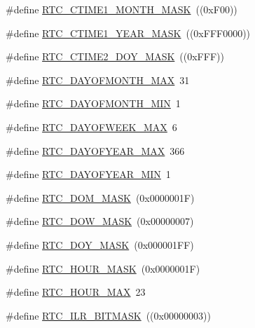 \begin{DoxyCompactItemize}
\item 
\#define \hyperlink{group__RTC__17XX__40XX_ga9778cbc861fb273870db239e31cc6140}{R\+T\+C\+\_\+\+C\+T\+I\+M\+E1\+\_\+\+M\+O\+N\+T\+H\+\_\+\+M\+A\+SK}~((0x\+F00))
\item 
\#define \hyperlink{group__RTC__17XX__40XX_gae56e613fe29951a7adaa30e1a3cad8b4}{R\+T\+C\+\_\+\+C\+T\+I\+M\+E1\+\_\+\+Y\+E\+A\+R\+\_\+\+M\+A\+SK}~((0x\+F\+F\+F0000))
\item 
\#define \hyperlink{group__RTC__17XX__40XX_gaef423e0d45dc1e2a201d44f8abb1253a}{R\+T\+C\+\_\+\+C\+T\+I\+M\+E2\+\_\+\+D\+O\+Y\+\_\+\+M\+A\+SK}~((0x\+F\+F\+F))
\item 
\#define \hyperlink{group__RTC__17XX__40XX_gaddd515ae325f802e35e8202fef5f2957}{R\+T\+C\+\_\+\+D\+A\+Y\+O\+F\+M\+O\+N\+T\+H\+\_\+\+M\+AX}~31
\item 
\#define \hyperlink{group__RTC__17XX__40XX_gafbcf1009356ffdad8f11920167908213}{R\+T\+C\+\_\+\+D\+A\+Y\+O\+F\+M\+O\+N\+T\+H\+\_\+\+M\+IN}~1
\item 
\#define \hyperlink{group__RTC__17XX__40XX_ga83c5c53e8b56ca8d48d9c46d7e8c50fa}{R\+T\+C\+\_\+\+D\+A\+Y\+O\+F\+W\+E\+E\+K\+\_\+\+M\+AX}~6
\item 
\#define \hyperlink{group__RTC__17XX__40XX_ga2621bb8d69ee212101605c2e3739db4d}{R\+T\+C\+\_\+\+D\+A\+Y\+O\+F\+Y\+E\+A\+R\+\_\+\+M\+AX}~366
\item 
\#define \hyperlink{group__RTC__17XX__40XX_ga132dcf308a59affe54749f4f11cd22a6}{R\+T\+C\+\_\+\+D\+A\+Y\+O\+F\+Y\+E\+A\+R\+\_\+\+M\+IN}~1
\item 
\#define \hyperlink{group__RTC__17XX__40XX_ga7c4ea655a8ccf43870c672c1058a133e}{R\+T\+C\+\_\+\+D\+O\+M\+\_\+\+M\+A\+SK}~(0x0000001\+F)
\item 
\#define \hyperlink{group__RTC__17XX__40XX_ga6564edf565a643214a54ffac364c69ca}{R\+T\+C\+\_\+\+D\+O\+W\+\_\+\+M\+A\+SK}~(0x00000007)
\item 
\#define \hyperlink{group__RTC__17XX__40XX_ga7c8c3332f827ea092523b75ef953bd8b}{R\+T\+C\+\_\+\+D\+O\+Y\+\_\+\+M\+A\+SK}~(0x000001\+F\+F)
\item 
\#define \hyperlink{group__RTC__17XX__40XX_ga3c6fd786e3cb5f56b71474fc2d26a8a4}{R\+T\+C\+\_\+\+H\+O\+U\+R\+\_\+\+M\+A\+SK}~(0x0000001\+F)
\item 
\#define \hyperlink{group__RTC__17XX__40XX_ga35630c42240ce2e8f74c38e1731d7e68}{R\+T\+C\+\_\+\+H\+O\+U\+R\+\_\+\+M\+AX}~23
\item 
\#define \hyperlink{group__RTC__17XX__40XX_ga9c00baff0fca4f8e747fadfe9ee12775}{R\+T\+C\+\_\+\+I\+L\+R\+\_\+\+B\+I\+T\+M\+A\+SK}~((0x00000003))

\end{DoxyCompactItemize}

